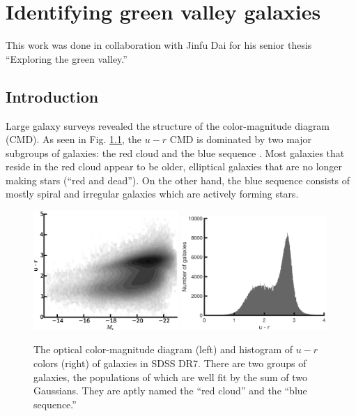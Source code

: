 \chapter[Green valley galaxies]{Identifying green valley galaxies}\label{ch:GV}

This work was done in collaboration with Jinfu Dai for his senior thesis 
``Exploring the green valley.''


\section{Introduction}

Large galaxy surveys \citep[like the Sloan Digital Sky Survey;][]{York00} 
revealed the structure of the color-magnitude diagram (CMD).  As seen in Fig. 
\ref{fig:ur_CMD}, the $u-r$ CMD is dominated by two major subgroups of galaxies: 
the red cloud and the blue sequence \citep{Strateva01, Baldry04}.  Most galaxies 
that reside in the red cloud appear to be older, elliptical galaxies that are no 
longer making stars (``red and dead'').  On the other hand, the blue sequence 
consists of mostly spiral and irregular galaxies which are actively forming stars.

\begin{figure}
    \includegraphics[width=0.49\textwidth]{Images/GV/ur_CMD_contour}
    \includegraphics[width=0.49\textwidth]{Images/GV/ur_hist}
    \caption[Optical color-magnitude diagram and histogram of $u-r$ in SDSS]{The 
    optical color-magnitude diagram (left) and histogram of $u-r$ colors (right) 
    of galaxies in SDSS DR7.  There are two groups of galaxies, the populations 
    of which are well fit by the sum of two Gaussians.  They are aptly named the 
    ``red cloud'' and the ``blue sequence.''}
    \label{fig:ur_CMD}
\end{figure}

